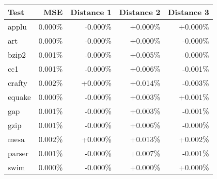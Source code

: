 \begin{tabular}{lrrrr}
\hline
Test & MSE & Distance 1 & Distance 2 & Distance 3 \\
\hline
applu & 0.000\% & -0.000\% & +0.000\% & +0.000\% \\
\hline
art & 0.000\% & -0.000\% & +0.000\% & -0.000\% \\
\hline
bzip2 & 0.001\% & -0.000\% & +0.005\% & -0.000\% \\
\hline
cc1 & 0.001\% & -0.000\% & +0.006\% & -0.001\% \\
\hline
crafty & 0.002\% & +0.000\% & +0.014\% & -0.003\% \\
\hline
equake & 0.000\% & -0.000\% & +0.003\% & +0.001\% \\
\hline
gap & 0.001\% & -0.000\% & +0.003\% & -0.001\% \\
\hline
gzip & 0.001\% & -0.000\% & +0.006\% & -0.000\% \\
\hline
mesa & 0.002\% & +0.000\% & +0.013\% & +0.002\% \\
\hline
parser & 0.001\% & -0.000\% & +0.007\% & -0.001\% \\
\hline
swim & 0.000\% & -0.000\% & +0.000\% & +0.000\% \\
\hline
\end{tabular}
